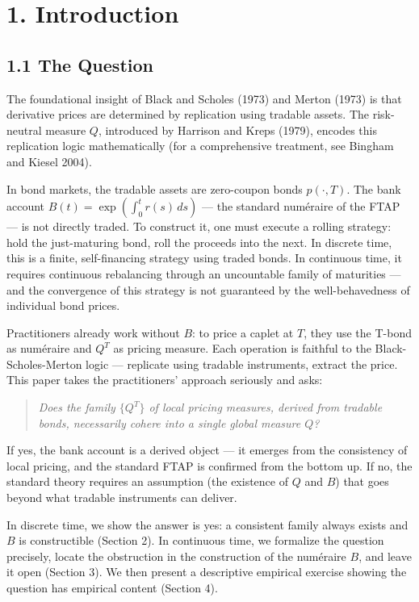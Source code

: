 \documentclass[
]{article}
\begin{document}
\section{1. Introduction}\label{introduction}

\subsection{1.1 The Question}\label{the-question}

The foundational insight of Black and Scholes (1973) and Merton (1973)
is that derivative prices are determined by replication using tradable
assets. The risk-neutral measure \(Q\), introduced by Harrison and Kreps
(1979), encodes this replication logic mathematically (for a
comprehensive treatment, see Bingham and Kiesel 2004).

In bond markets, the tradable assets are zero-coupon bonds
\(p(\cdot,T)\). The bank account
\(B(t) = \exp\left( \int_{0}^{t} r(s) \, ds \right)\) --- the standard
numéraire of the FTAP --- is not directly traded. To construct it, one
must execute a rolling strategy: hold the just-maturing bond, roll the
proceeds into the next. In discrete time, this is a finite,
self-financing strategy using traded bonds. In continuous time, it
requires continuous rebalancing through an uncountable family of
maturities --- and the convergence of this strategy is not guaranteed by
the well-behavedness of individual bond prices.

Practitioners already work without \(B\): to price a caplet at \(T\),
they use the T-bond as numéraire and \(Q^T\) as pricing measure. Each
operation is faithful to the Black-Scholes-Merton logic --- replicate
using tradable instruments, extract the price. This paper takes the
practitioners' approach seriously and asks:

\begin{quote}
\emph{Does the family \(\{Q^T\}\) of local pricing measures, derived
from tradable bonds, necessarily cohere into a single global measure
\(Q\)?}
\end{quote}

If yes, the bank account is a derived object --- it emerges from the
consistency of local pricing, and the standard FTAP is confirmed from
the bottom up. If no, the standard theory requires an assumption (the
existence of \(Q\) and \(B\)) that goes beyond what tradable instruments
can deliver.

In discrete time, we show the answer is yes: a consistent family always
exists and \(B\) is constructible (Section 2). In continuous time, we
formalize the question precisely, locate the obstruction in the
construction of the numéraire \(B\), and leave it open (Section 3). We
then present a descriptive empirical exercise showing the question has
empirical content (Section 4).
\end{document}
